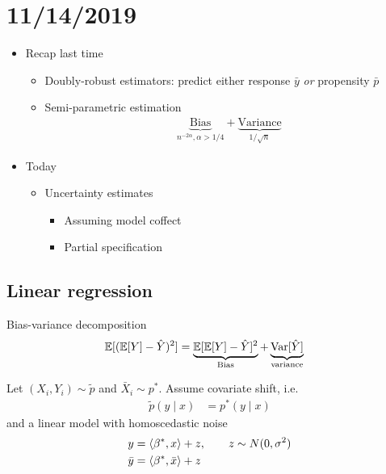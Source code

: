 \section{11/14/2019}%

\begin{itemize}
  \item Recap last time
    \begin{itemize}
      \item Doubly-robust estimators: predict either response $\bar{y}$
	\emph{or} propensity $\bar{p}$
      \item Semi-parametric estimation
	\begin{align}
	  \underbrace{\text{Bias}}_{n^{-2\alpha}, \alpha > 1/4}
	  + \underbrace{\text{Variance}}_{1/\sqrt{n}}
	\end{align}
    \end{itemize}
  \item Today
    \begin{itemize}
      \item Uncertainty estimates
	\begin{itemize}
	  \item Assuming model coffect
	  \item Partial specification
	\end{itemize}
    \end{itemize}
\end{itemize}

\subsection{Linear regression}

Bias-variance decomposition
\begin{align}
  \mathbb{E}[(\mathbb{E}[Y] - \hat{Y})^2]
  &= \underbrace{\mathbb{E}[\mathbb{E}[Y] - \hat{Y}]^2}_{\text{Bias}}
  + \underbrace{\operatorname{Var}[\hat{Y}]}_{\text{variance}}
\end{align}

Let $(X_i, Y_i) \sim \tilde{p}$ and $\bar{X}_i \sim p^*$.
Assume covariate shift, i.e.
\begin{align}
  \tilde{p}(y \mid x) &= p^*(y \mid x)
\end{align}
and a linear model with homoscedastic noise
\begin{align}
  y &= \braket{\beta^*, x} + z, \qquad z \sim N(0, \sigma^2) \\
  \bar{y} &= \braket{\beta^*, \bar{x}} + z
\end{align}

